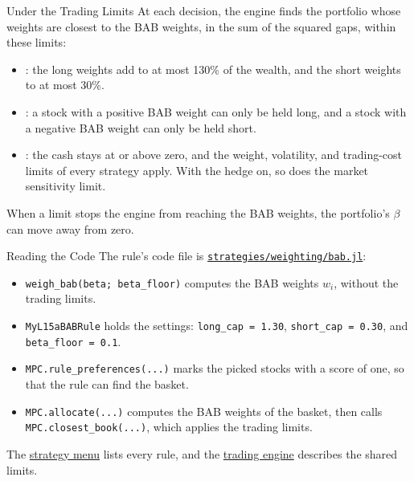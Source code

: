 \documentclass[aspectratio=169,11pt]{beamer}
\newcommand{\repo}{https://github.com/varnerlab/CHEME-5660-CourseRepository-Fall-2026/blob/main/lectures/week-15/L15a}
\begin{document}
\begin{frame}{Under the Trading Limits}
  \vspace{0.3em}
  At each decision, the engine finds the portfolio whose weights are closest to the BAB weights,
  in the sum of the squared gaps, within these limits:
  \begin{itemize}\setlength{\itemsep}{0.5em}
    \item {}: the long weights add to at most 130\% of the wealth, and
      the short weights to at most 30\%.
    \item {}: a stock with a positive BAB weight can only be held long, and a stock
      with a negative BAB weight can only be held short.
    \item {}: the cash stays at or above zero, and the weight, volatility, and
      trading-cost limits of every strategy apply. With the hedge on, so does the market
      sensitivity limit.
  \end{itemize}

  \vspace{0.5em}
  When a limit stops the engine from reaching the BAB weights, the portfolio's $\beta$ can move
  away from zero.
\end{frame}

\begin{frame}{Reading the Code}
  \vspace{0.3em}
  The rule's code file is
  \href{\repo/strategies/weighting/bab.jl}{\texttt{strategies/weighting/bab.jl}}:
  \begin{itemize}\setlength{\itemsep}{0.5em}
    \item \texttt{weigh\_bab(beta; beta\_floor)} computes the BAB weights $w_{i}$, without the
      trading limits.
    \item \texttt{MyL15aBABRule} holds the settings: \texttt{long\_cap = 1.30},
      \texttt{short\_cap = 0.30}, and \texttt{beta\_floor = 0.1}.
    \item \texttt{MPC.rule\_preferences(...)} marks the picked stocks with a score of one, so that
      the rule can find the basket.
    \item \texttt{MPC.allocate(...)} computes the BAB weights of the basket, then calls
      \texttt{MPC.closest\_book(...)}, which applies the trading limits.
  \end{itemize}

  \vspace{0.5em}
  The \href{\repo/strategies/CHEME-5660-L15a-Strategy-Menu-Fall-2026.ipynb}{strategy menu} lists
  every rule, and the
  \href{\repo/engine/CHEME-5660-L15a-Trading-Engine-Fall-2026.ipynb}{trading engine} describes
  the shared limits.
\end{frame}
\end{document}
